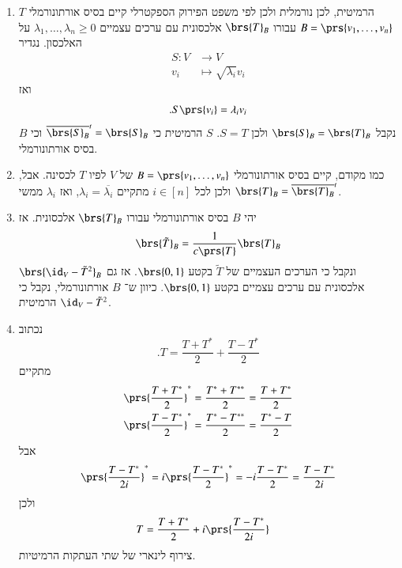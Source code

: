 \documentclass[a4paper,10pt,oneside,openany]{article}
\begin{document}
\begin{solution}
\begin{enumerate}
\item $T$
הרמיטית, לכן נורמלית ולכן לפי משפט הפירוק הספקטרלי קיים בסיס אורתונורמלי
$B = \prs{v_1, \ldots, v_n}$
עבורו
$\brs{T}_B$
אלכסונית עם ערכים עצמיים
$\lambda_1, \ldots, \lambda_n \geq 0$
על האלכסון.
נגדיר
\begin{align*}
S \colon V &\to V \\
v_i &\mapsto \sqrt{\lambda_i} v_i
\end{align*}
ואז
\begin{align*}
\text{.} S\prs{v_i} = \lambda_i v_i
\end{align*}
נקבל
$\brs{S}_B = \brs{T}_B$
ולכן
$S = T$.
$S$
הרמיטית כי
$\overline{\brs{S}_B}^t = \brs{S}_B$
וכי
$B$
בסיס אורתונורמלי.

\item 
כמו מקודם, קיים בסיס אורתונורמלי
$B = \prs{v_1, \ldots, v_n}$
של
$V$
לפיו
$T$
לכסינה.
אבל,
$\brs{T}_B = \overline{\brs{T}_B}^t$
ולכן לכל
$i \in [n]$
מתקיים
$\lambda_i = \overline{\lambda_i}$,
ואז
$\lambda_i$
ממשי.

\item
יהי
$B$
בסיס אורתונורמלי עבורו
$\brs{T}_B$
אלכסונית. אז
\[\brs{\tilde{T}}_B = \frac{1}{c\prs{T}} \brs{T}_B\]
ונקבל כי הערכים העצמיים של
$\tilde{T}$
בקטע
$\brs{0,1}$.
אז גם
$\brs{\id_V - \tilde{T}^2}_B$
אלכסונית עם ערכים עצמיים בקטע
$\brs{0,1}$.
כיוון ש־%
$B$
אורתונורמלי, נקבל כי
$\id_V - \tilde{T}^2$
הרמיטית.

\item נכתוב
\[\text{.} T = \frac{T+T^*}{2} + \frac{T-T^*}{2}\]
מתקיים
\begin{align*}
\prs{\frac{T + T^*}{2}}^* &= \frac{T^* + T^{**}}{2} = \frac{T+T^*}{2} \\
\prs{\frac{T - T^*}{2}}^* &= \frac{T^* - T^{**}}{2} = \frac{T^* - T}{2}
\end{align*}
אבל
\[\prs{\frac{T-T^*}{2i}}^* = i \prs{\frac{T-T^*}{2}}^* = -i {\frac{T-T^*}{2}} = \frac{T - T^*}{2i}\]
ולכן
\begin{align*}
T &= \frac{T+T^*}{2} + i \prs{\frac{T-T^*}{2i}}
\end{align*}
צירוף לינארי של שתי העתקות הרמיטיות.


\end{enumerate}
\end{solution}
\end{document}
